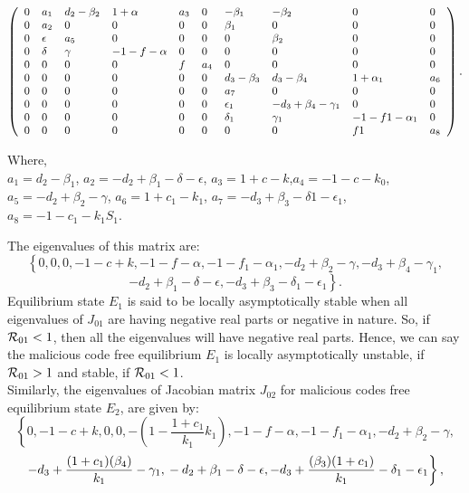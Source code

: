 \noindent
\begin{math}
\small\left(
        \begin{array}{llllllllll}
          0 & a_1 & d_{2} - \beta_{2} & 1 + \alpha & a_3 & 0 & - \beta_{1} & - \beta_{2} & 0 & 0 \\
          0 & a_2 & 0 & 0 & 0 & 0  & \beta_{1} & 0 & 0 & 0\\
          0 & \epsilon & a_5 & 0 & 0 & 0 & 0 & \beta_{2} & 0 & 0 \\
          0 & \delta & \gamma & -1-f-\alpha & 0 & 0 & 0 & 0 & 0 & 0 \\
          0 & 0 & 0 & 0 & f & a_4 & 0 & 0 & 0 & 0 \\
          0 & 0 & 0 & 0 & 0 & 0 & d_{3} - \beta_{3} & d_{3} - \beta_{4} & 1 + \alpha_{1} & a_6 \\
          0 & 0 & 0 & 0 & 0 & 0 & a_7 & 0 & 0 & 0 \\
          0 & 0 & 0 & 0 & 0 & 0 & \epsilon_{1} & -d_{3} + \beta_{4} - \gamma_{1} & 0 & 0  \\
          0 & 0 & 0 & 0 & 0 & 0 & \delta_{1} & \gamma_{1} & -1 - f{1} - \alpha_{1} & 0  \\
          0 & 0 & 0 & 0 & 0 & 0 & 0 & 0 & f{1} & a_8  \\
        \end{array}
      \right)\normalsize.
\end{math}

\noindent Where,\\
$a_1=d_{2} - \beta_{1}$, $a_2=-d_{2}+\beta_{1}-\delta-\epsilon$,
$a_3= 1 + c -k$,$a_4=- 1 - c - k_{0}$, $a_5=-d_{2}+\beta_{2}-\gamma$, $a_6=1 + c_{1} - k_{1}$, $a_7=-d_{3} + \beta_{3} - \delta{1} - \epsilon_{1}$, $a_8=- 1 - c_{1} - k_{1} S_{1}.$

\noindent The eigenvalues of this matrix are:
\noindent \[
\left\{0,0,0,-1-c+k,-1-f-\alpha,-1-f_{1}-\alpha_{1},-d_{2}+\beta_{2}-\gamma, -d_{3}+\beta_{4}-\gamma_{1},
  \right. \]
\[ \left. -d_{2}+\beta_{1}-\delta-\epsilon, -d_{3}+\beta_{3}-\delta_{1}-\epsilon_{1} \right\}. \]
\noindent Equilibrium state $E_1$ is said to be locally asymptotically stable when all  eigenvalues of $J_ {01}$ are having negative real parts or negative in nature.
So, if ${{\cal R}}_{01}<1$, then all the eigenvalues will have negative real parts. Hence, we can say the malicious code free equilibrium $E_1$ is locally asymptotically unstable, if ${\cal R}_{01} > 1$ and stable, if ${\cal R}_{01} < 1$.\\
Similarly, the eigenvalues of Jacobian matrix $J_{02}$ for malicious codes free equilibrium state $E_2$, are given by:
\[
\left\{0,-1-c+k,0,0,-(1 - \frac{1+c_{1}}{k_{1}}k_{1}),-1-f-\alpha,-1-f_{1}-\alpha_{1},-d_{2}+\beta_{2}-\gamma,
  \right. \]
\[ \left. -d_{3}+ \frac{(1+c_{1})(\beta_{4})}{k_{1}}-\gamma_{1},\\-d_{2}+\beta_{1}-\delta-\epsilon,-d_{3}+\frac{(\beta_{3})(1+c_{1})
}{k_{1}}-\delta_{1}-\epsilon_{1}\right\}, \]

